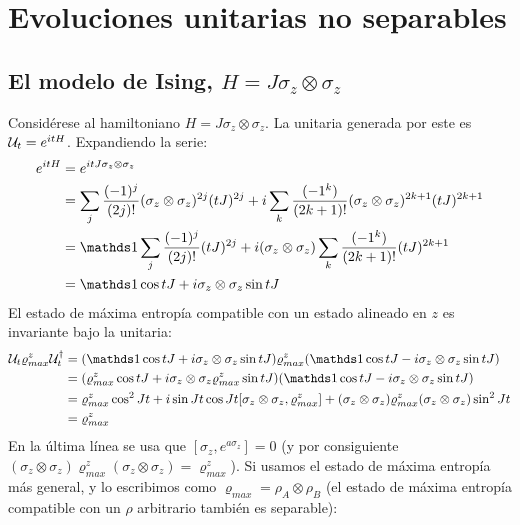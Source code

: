 \section{Evoluciones unitarias no separables}
\subsection{El modelo de Ising, $H=J\sigma_{z}\otimes\sigma_{z}$}\label{sec:Ising}
Considérese al hamiltoniano $H=J\sigma_{z}\otimes\sigma_{z}$. La unitaria generada por este es $\mathcal{U}_{t}=e^{itH}$. Expandiendo la serie:
\begin{align*}
    e^{itH}&=e^{itJ\sigma_{z}\otimes\sigma_{z}}\\
    &=\sum_{j}\frac{(-1)^{j}}{(2j)!}(\sigma_{z}\otimes\sigma_{z})^{2j}(tJ)^{2j}+i\sum_{k}\frac{(-1^{k})}{(2k+1)!}(\sigma_{z}\otimes\sigma_{z})^{2k+1}(tJ)^{2k+1}\\
    &=\Id\sum_{j}\frac{(-1)^{j}}{(2j)!}(tJ)^{2j}+i(\sigma_{z}\otimes\sigma_{z})\sum_{k}\frac{(-1^{k})}{(2k+1)!}(tJ)^{2k+1}\\
    &=\Id \cos{tJ} + i\sigma_{z}\otimes\sigma_{z}\sin{tJ}
\end{align*}
El estado de máxima entropía compatible con un estado alineado en $z$ es invariante bajo la unitaria:
\begin{align*}
    \mcU_{t}\varrho_{max}^{z}\mcU_{t}^{\dag}&=(\Id \cos{tJ} + i\sigma_{z}\otimes\sigma_{z}\sin{tJ})\varrho_{max}^{z}(\Id \cos{tJ} - i\sigma_{z}\otimes\sigma_{z}\sin{tJ})\\
    &=(\varrho_{max}^{z} \cos{tJ} + i\sigma_{z}\otimes\sigma_{z}\varrho_{max}^{z}\sin{tJ})(\Id \cos{tJ} - i\sigma_{z}\otimes\sigma_{z}\sin{tJ})\\
    &=\varrho_{max}^{z} \cos^{2}{Jt}+i\sin{Jt}\cos{Jt}[\sigma_{z}\otimes\sigma_{z},\varrho_{max}^{z}]+(\sigma_{z}\otimes\sigma_{z}) \varrho_{max}^{z} (\sigma_{z}\otimes\sigma_{z}) \sin^{2}{Jt}\\
    &=\varrho_{max}^{z}
\end{align*}
En la última línea se usa que $[\sigma_{z},e^{a\sigma_{z}}]=0$ (y por consiguiente $(\sigma_{z}\otimes\sigma_{z}) \varrho_{max}^{z} (\sigma_{z}\otimes\sigma_{z})=\varrho_{max}^{z}$). Si usamos el estado de máxima entropía más general, y lo escribimos como $\varrho_{max}=\rho_{A}\otimes\rho_{B}$ (el estado de máxima entropía compatible con un $\rho$ arbitrario también es separable):
